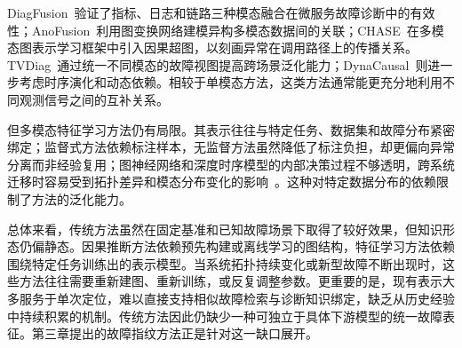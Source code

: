 DiagFusion~\cite{zhang2023robust}验证了指标、日志和链路三种模态融合在微服务故障诊断中的有效性；AnoFusion~\cite{anofusion}利用图变换网络建模异构多模态数据间的关联；CHASE~\cite{chase-zhao2024}在多模态图表示学习框架中引入因果超图，以刻画异常在调用路径上的传播关系。TVDiag~\cite{tvdiag}通过统一不同模态的故障视图提高跨场景泛化能力；DynaCausal~\cite{dynacausal}则进一步考虑时序演化和动态依赖。相较于单模态方法，这类方法通常能更充分地利用不同观测信号之间的互补关系。

但多模态特征学习方法仍有局限。其表示往往与特定任务、数据集和故障分布紧密绑定；监督式方法依赖标注样本，无监督方法虽然降低了标注负担，却更偏向异常分离而非经验复用；图神经网络和深度时序模型的内部决策过程不够透明，跨系统迁移时容易受到拓扑差异和模态分布变化的影响~\cite{zhang2023robust,sun2024art}。这种对特定数据分布的依赖限制了方法的泛化能力。

总体来看，传统方法虽然在固定基准和已知故障场景下取得了较好效果，但知识形态仍偏静态。因果推断方法依赖预先构建或离线学习的图结构，特征学习方法依赖围绕特定任务训练出的表示模型。当系统拓扑持续变化或新型故障不断出现时，这些方法往往需要重新建图、重新训练，或反复调整参数。更重要的是，现有表示大多服务于单次定位，难以直接支持相似故障检索与诊断知识绑定，缺乏从历史经验中持续积累的机制。传统方法因此仍缺少一种可独立于具体下游模型的统一故障表征。第三章提出的故障指纹方法正是针对这一缺口展开。
